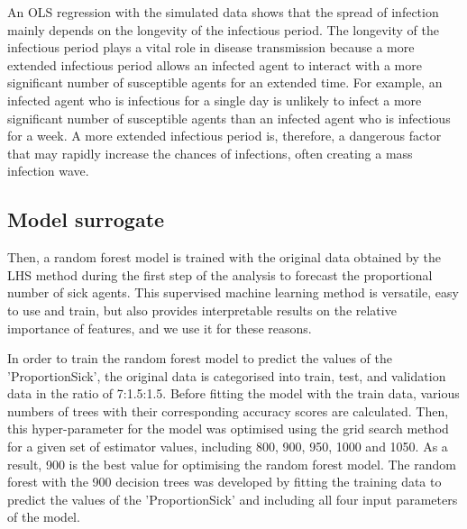 \documentclass[smallextended]{svjour3}       %
\begin{document}

An OLS regression with the simulated data shows that the spread of infection mainly depends on the longevity of the infectious period. The longevity of the infectious period plays a vital role in disease transmission because a more extended infectious period allows an infected agent to interact with a more significant number of susceptible agents for an extended time. For example, an infected agent who is infectious for a single day is unlikely to infect a more significant number of susceptible agents than an infected agent who is infectious for a week. A more extended infectious period is, therefore, a dangerous factor that may rapidly increase the chances of infections, often creating a mass infection wave.

\subsection{Model surrogate}

Then, a random forest model is trained with the original data obtained by the LHS method during the first step of the analysis to forecast the proportional number of sick agents. This supervised machine learning method is versatile, easy to use and train, but also provides interpretable results on the relative importance of features, and we use it for these reasons.

In order to train the random forest model to predict the values of the 'ProportionSick', the original data is categorised into train, test, and validation data in the ratio of 7:1.5:1.5. Before fitting the model with the train data, various numbers of trees with their corresponding accuracy scores are calculated. Then, this hyper-parameter for the model was optimised using the grid search method for a given set of estimator values, including 800, 900, 950, 1000 and 1050. As a result, 900 is the best value for optimising the random forest model. The random forest with the 900 decision trees was developed by fitting the training data to predict the values of the 'ProportionSick' and including all four input parameters of the model.
\end{document}
